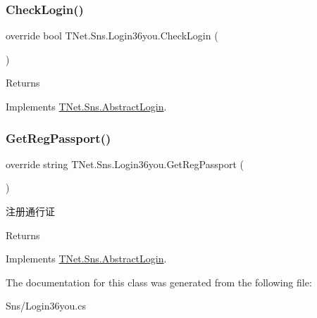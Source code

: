 \subsubsection{\texorpdfstring{Check\+Login()}{CheckLogin()}}
{\footnotesize\ttfamily override bool T\+Net.\+Sns.\+Login36you.\+Check\+Login (\begin{DoxyParamCaption}{ }\end{DoxyParamCaption})\hspace{0.3cm}{\ttfamily [virtual]}}





\begin{DoxyReturn}{Returns}

\end{DoxyReturn}


Implements \mbox{\hyperlink{class_t_net_1_1_sns_1_1_abstract_login_a6b5dac3d6d46efb7b1e4049e674105e5}{T\+Net.\+Sns.\+Abstract\+Login}}.

\mbox{\label{class_t_net_1_1_sns_1_1_login36you_a01060a26e8212aaac7e29b634263001a}} 
\subsubsection{\texorpdfstring{Get\+Reg\+Passport()}{GetRegPassport()}}
{\footnotesize\ttfamily override string T\+Net.\+Sns.\+Login36you.\+Get\+Reg\+Passport (\begin{DoxyParamCaption}{ }\end{DoxyParamCaption})\hspace{0.3cm}{\ttfamily [virtual]}}



注册通行证 

\begin{DoxyReturn}{Returns}

\end{DoxyReturn}


Implements \mbox{\hyperlink{class_t_net_1_1_sns_1_1_abstract_login_a3930eb564bb4804e1b646d749f20907a}{T\+Net.\+Sns.\+Abstract\+Login}}.



The documentation for this class was generated from the following file\+:\begin{DoxyCompactItemize}
\item 
Sns/Login36you.\+cs\end{DoxyCompactItemize}
